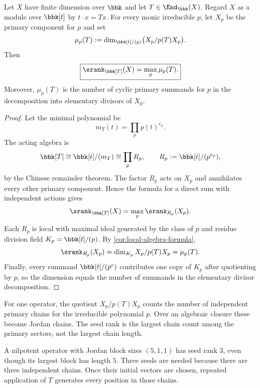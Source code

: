 \begin{theorem}
\label{thm:single-operator}
Let $X$ have finite dimension over $\bbk$ and let $T\in\End_{\bbk}(X)$.  Regard $X$ as a module over $\bbk[t]$ by $t\cdot x=Tx$.  For every monic irreducible $p$, let $X_p$ be the primary component for $p$ and set
\[
\mu_p(T):=
\dim_{\bbk[t]/(p)}\bigl(X_p/p(T)X_p\bigr).
\]
Then
\[
\boxed{
\srank_{\bbk[T]}(X)=\max_p\mu_p(T).
}
\]
Moreover, $\mu_p(T)$ is the number of cyclic primary summands for $p$ in the decomposition into elementary divisors of $X_p$.
\end{theorem}

\begin{proof}
Let the minimal polynomial be
\[
m_T(t)=\prod_{p}p(t)^{e_p}.
\]
The acting algebra is
\[
\bbk[T]\cong\bbk[t]/(m_T)
\cong\prod_pR_p,
\qquad
R_p:=\bbk[t]/(p^{e_p}),
\]
by the Chinese remainder theorem.  The factor $R_p$ acts on $X_p$ and annihilates every other primary component.  Hence the formula for a direct sum with independent actions gives
\[
\srank_{\bbk[T]}(X)=\max_p\srank_{R_p}(X_p).
\]
Each $R_p$ is local with maximal ideal generated by the class of $p$ and residue division field $K_p=\bbk[t]/(p)$.  By \cref{cor:local-algebra-formula},
\[
\srank_{R_p}(X_p)
=
\dim_{K_p}X_p/p(T)X_p
=
\mu_p(T).
\]
Finally, every summand $\bbk[t]/(p^e)$ contributes one copy of $K_p$ after quotienting by $p$, so the dimension equals the number of summands in the elementary divisor decomposition.
\end{proof}

\begin{interpretation}
For one operator, the quotient \(X_p/p(T)X_p\) counts the number of independent primary chains for the irreducible polynomial \(p\).  Over an algebraic closure these become Jordan chains.  The seed rank is the largest chain count among the primary sectors, not the largest chain length.
\end{interpretation}

\begin{microexample}[title={Block count versus block size}]
A nilpotent operator with Jordan block sizes \((5,1,1)\) has seed rank \(3\), even though its largest block has length \(5\).  Three seeds are needed because there are three independent chains.  Once their initial vectors are chosen, repeated application of \(T\) generates every position in those chains.
\end{microexample}


